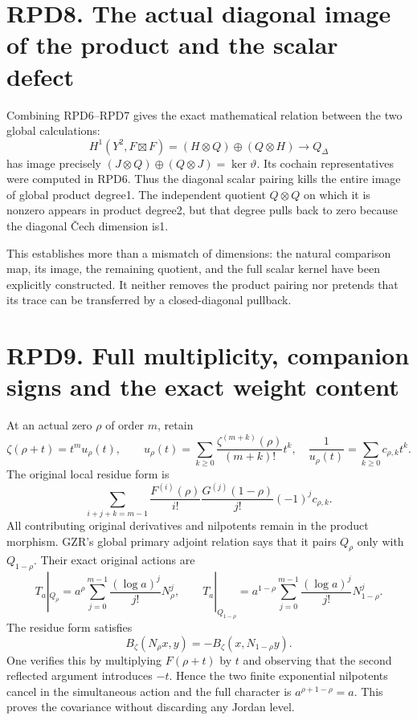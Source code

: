 \section{RPD8. The actual diagonal image of the product and the scalar
defect}\label{rpd8.-the-actual-diagonal-image-of-the-product-and-the-scalar-defect}

Combining RPD6--RPD7 gives the exact mathematical relation between the
two global calculations: \[
H^1(Y^2,F\boxtimes F)
=(H\otimes Q)\oplus(Q\otimes H)
\longrightarrow Q_\Delta
\] has image precisely \((J\otimes Q)\oplus(Q\otimes J)=\ker\vartheta\).
Its cochain representatives were computed in RPD6. Thus the diagonal
scalar pairing kills the entire image of global product degree1. The
independent quotient \(Q\otimes Q\) on which it is nonzero appears in
product degree2, but that degree pulls back to zero because the diagonal
Čech dimension is1.

This establishes more than a mismatch of dimensions: the natural
comparison map, its image, the remaining quotient, and the full scalar
kernel have been explicitly constructed. It neither removes the product
pairing nor pretends that its trace can be transferred by a
closed-diagonal pullback.

\section{RPD9. Full multiplicity, companion signs and the exact weight
content}\label{rpd9.-full-multiplicity-companion-signs-and-the-exact-weight-content}

At an actual zero \(\rho\) of order \(m\), retain \[
\zeta(\rho+t)=t^m u_\rho(t),\qquad
u_\rho(t)=\sum_{k\ge0}\frac{\zeta^{(m+k)}(\rho)}{(m+k)!}t^k,
\quad
\frac1{u_\rho(t)}=\sum_{k\ge0}c_{\rho,k}t^k.
\] The original local residue form is \[
\sum_{i+j+k=m-1}
\frac{F^{(i)}(\rho)}{i!}
\frac{G^{(j)}(1-\rho)}{j!}
(-1)^j c_{\rho,k}.
\tag{RPD9.1}
\] All contributing original derivatives and nilpotents remain in the
product morphism. GZR's global primary adjoint relation says that it
pairs \(Q_\rho\) only with \(Q_{1-\rho}\). Their exact original actions
are \[
T_a|_{Q_\rho}=a^\rho
\sum_{j=0}^{m-1}\frac{(\log a)^j}{j!}N_\rho^j,\qquad
T_a|_{Q_{1-\rho}}=a^{1-\rho}
\sum_{j=0}^{m-1}\frac{(\log a)^j}{j!}N_{1-\rho}^j.
\tag{RPD9.2}
\] The residue form satisfies \[
B_\zeta(N_\rho x,y)=-B_\zeta(x,N_{1-\rho}y).
\tag{RPD9.3}
\] One verifies this by multiplying \(F(\rho+t)\) by \(t\) and observing
that the second reflected argument introduces \(-t\). Hence the two
finite exponential nilpotents cancel in the simultaneous action and the
full character is \(a^{\rho+1-\rho}=a\). This proves the covariance
without discarding any Jordan level.

